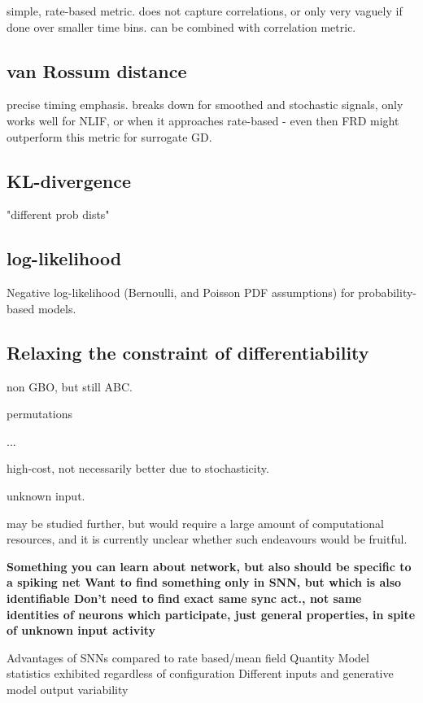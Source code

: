 \documentclass[mphil,deptreport,ai]{infthesis} %
\begin{document}
simple, rate-based metric. does not capture correlations, or only very vaguely if done over smaller time bins. 
can be combined with correlation metric.

\subsection{van Rossum distance}

precise timing emphasis. breaks down for smoothed and stochastic signals, only works well for NLIF, or when it approaches rate-based - even then FRD might outperform this metric for surrogate GD.

\subsection{KL-divergence}

"different prob dists"

\subsection{log-likelihood}

Negative log-likelihood (Bernoulli, and Poisson PDF assumptions) for probability-based models.

\subsection{Relaxing the constraint of differentiability}

non GBO, but still ABC.

permutations

...

high-cost, not necessarily better due to stochasticity. 

unknown input.

may be studied further, but would require a large amount of computational resources, and it is currently unclear whether such endeavours would be fruitful. %

\textbf{Something you can learn about network, but also should be specific to a spiking net
Want to find something only in SNN, but which is also identifiable
Don’t need to find exact same sync act., not same identities of neurons which participate, just general properties, in spite of unknown input activity}

Advantages of SNNs compared to rate based/mean field
Quantity
Model statistics exhibited regardless of configuration
Different inputs and generative model output variability
\end{document}
